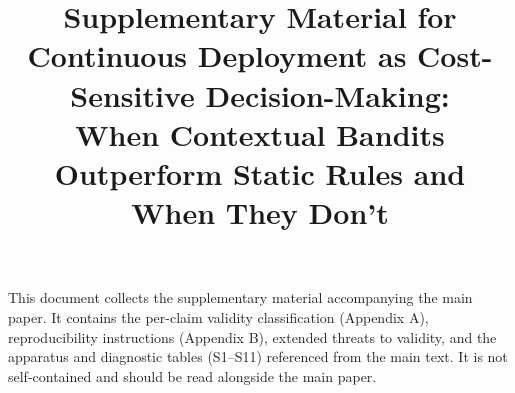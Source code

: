 \documentclass[conference]{IEEEtran}
\title{Supplementary Material for\\
Continuous Deployment as Cost-Sensitive Decision-Making:\\
When Contextual Bandits Outperform Static Rules and When They Don't}
\author{\IEEEauthorblockN{Abishek Kumar Giri}\IEEEauthorblockA{Stockton University}}
\begin{document}
\maketitle

This document collects the supplementary material accompanying the main
paper. It contains the per-claim validity classification (Appendix A),
reproducibility instructions (Appendix B), extended threats to validity,
and the apparatus and diagnostic tables (S1--S11) referenced from the
main text. It is not self-contained and should be read alongside the
main paper.






\end{document}
